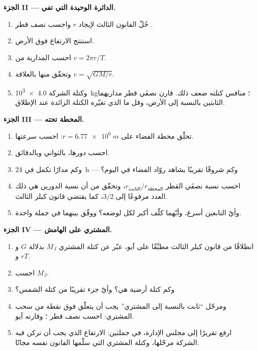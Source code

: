 \begin{problem}
\medskip
\noindent\textbf{الجزء II --- الدائرة الوحيدة التي تفي.}
\begin{enumerate}[resume]
  \item حُلّ القانون الثالث لإيجاد $r$ واحسب نصف قطر .
  \item استنتج الارتفاع فوق الأرض.
  \item احسب  المدارية من $v = 2\pi r/T$.
  \item وتحقّق منها بالعلاقة $v = \sqrt{GM/r}$.
  \item وكتلة  الشركة \qty{4.0e3}{kg}؛  منافس
        كتلته ضعف ذلك. قارن نصفَي قطر مداريهما الثابتين بالنسبة إلى الأرض،
        وقل ما الذي تغيّره الكتلة الزائدة عند الإطلاق.
\end{enumerate}

\medskip
\noindent\textbf{الجزء III --- المحطة تحته.}
\begin{enumerate}[resume]
  \item تحلّق محطة الفضاء على $r = \qty{6.77e6}{m}$: احسب
        سرعتها.
  \item احسب دورها، بالثواني وبالدقائق.
  \item وكم مدارًا تكمل في \qty{24}{h} --- وكم شروقًا تقريبًا
        يشاهد روّاد الفضاء في اليوم؟
  \item احسب نسبة نصفَي القطر $r_{\text{الثابت}}/r_{\text{المحطة}}$،
        وتحقّق من أن نسبة الدورين هي ذلك العدد مرفوعًا إلى
         $3/2$، كما يقتضي قانون كبلر الثالث.
  \item وأيّ التابعين أسرع، وأيّهما كلّف  أكبر لكل
         لوضعه؟ ووفّق بينهما في جملة واحدة.
\end{enumerate}

\medskip
\noindent\textbf{الجزء IV ---  المشتري على الهامش.}
\begin{enumerate}[resume]
  \item انطلاقًا من قانون كبلر الثالث مطبَّقًا على آيو، عبّر عن كتلة
        المشتري $M_J$ بدلالة $G$ و$r$ و$T$.
  \item احسب $M_J$.
  \item وكم كتلة أرضية هي؟ وأيّ جزء تقريبًا من
        كتلة الشمس؟
  \item ومرحّل ``ثابت بالنسبة إلى المشتري'' يجب أن يتعلّق فوق نقطة من
        سحب المشتري: احسب نصف قطر ؛ وقارنه
         آيو.
  \item ارفع تقريرًا إلى مجلس الإدارة، في جملتين: الارتفاع الذي يجب أن تركن فيه
        الشركة مرحّلها، وكتلة المشتري التي
        سلّمها القانون نفسه مجانًا.
\end{enumerate}
\end{problem}
